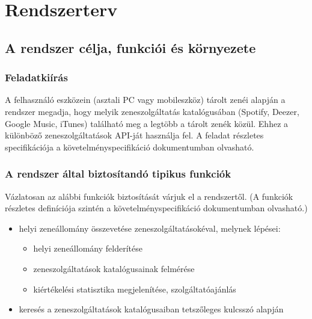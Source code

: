 \section{Rendszerterv}
\label{sec:documentation}

\subsection{A rendszer célja, funkciói és környezete}
\label{sub:arendszercelja}

\subsubsection{Feladatkiírás}
\label{ssub:feladatkiiras}

A felhasználó eszközein (asztali PC vagy mobileszköz) tárolt zenéi alapján a rendszer megadja, hogy melyik zeneszolgáltatás katalógusában (Spotify, Deezer, Google Music, iTunes) található meg a legtöbb a tárolt zenék közül. Ehhez a különböző zeneszolgáltatások API-ját használja fel. 
A feladat részletes specifikációja a követelményspecifikáció dokumentumban olvasható.


\subsubsection{A rendszer által biztosítandó tipikus funkciók }
\label{ssub:arendszeraltalbiztositandofunkciok}

Vázlatosan az alábbi funkciók biztosítását várjuk el a rendszertől. (A funkciók részletes definíciója szintén a követelményspecifikáció dokumentumban olvasható.) 

\begin{itemize}
	\item helyi zeneállomány összevetése zeneszolgáltatásokéval, melynek lépései:
		\begin{itemize}
			\item helyi zeneállomány felderítése 
			\item zeneszolgáltatások katalógusainak felmérése 
			\item kiértékelési statisztika megjelenítése, szolgáltatóajánlás
		\end{itemize}
	\item keresés a zeneszolgáltatások katalógusaiban tetszőleges kulcsszó alapján
\end{itemize}


